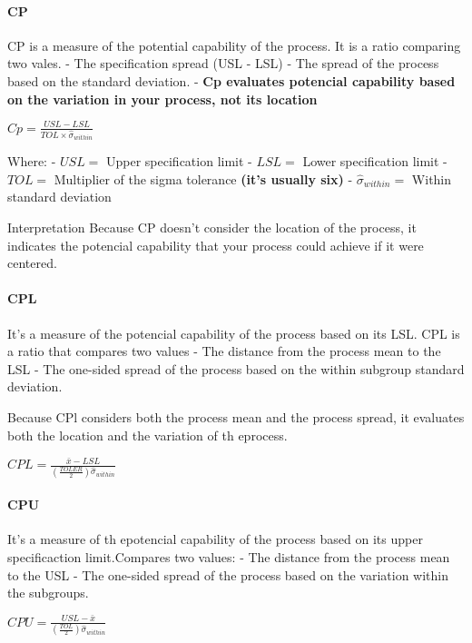 \documentclass[11pt]{article}
\begin{document}
\hypertarget{cp}{%
\paragraph{CP}\label{cp}}

CP is a measure of the potential capability of the process. It is a
ratio comparing two vales. - The specification spread (USL - LSL) - The
spread of the process based on the standard deviation. - \textbf{Cp
evaluates potencial capability based on the variation in your process,
not its location}

\(Cp = \frac{USL - LSL}{TOL \times \hat{\sigma}_{within}}\)

Where: - \(USL =\) Upper specification limit - \(LSL =\) Lower
specification limit - \(TOL =\) Multiplier of the sigma tolerance
\textbf{(it's usually six)} - \(\hat{\sigma}_{within} =\) Within
standard deviation

Interpretation Because CP doesn't consider the location of the process,
it indicates the potencial capability that your process could achieve if
it were centered.

\hypertarget{cpl}{%
\paragraph{CPL}\label{cpl}}

It's a measure of the potencial capability of the process based on its
LSL. CPL is a ratio that compares two values - The distance from the
process mean to the LSL - The one-sided spread of the process based on
the within subgroup standard deviation.

Because CPl considers both the process mean and the process spread, it
evaluates both the location and the variation of th eprocess.

\(CPL = \frac{\bar{x} - LSL}{(\frac{TOLER}{2})\hat{\sigma}_{within}}\)

\hypertarget{cpu}{%
\paragraph{CPU}\label{cpu}}

It's a measure of th epotencial capability of the process based on its
upper specificaction limit.Compares two values: - The distance from the
process mean to the USL - The one-sided spread of the process based on
the variation within the subgroups.

\(CPU = \frac{USL - \bar{x} }{(\frac{TOL}{2})\hat{\sigma}_{within}}\)
\end{document}

